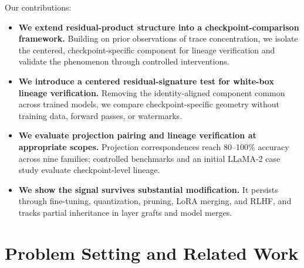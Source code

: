 \documentclass[letterpaper]{article}
\begin{document}
Our contributions:
\begin{itemize}[leftmargin=*,nosep]
\item \textbf{We extend residual-product structure into a checkpoint-comparison framework.} Building on prior observations of trace concentration, we isolate the centered, checkpoint-specific component for lineage verification and validate the phenomenon through controlled interventions.
\item \textbf{We introduce a centered residual-signature test for white-box lineage verification.} Removing the identity-aligned component common across trained models, we compare checkpoint-specific geometry without training data, forward passes, or watermarks.
\item \textbf{We evaluate projection pairing and lineage verification at appropriate scopes.} Projection correspondences reach 80--100\% accuracy across nine families; controlled benchmarks and an initial LLaMA-2 case study evaluate checkpoint-level lineage.
\item \textbf{We show the signal survives substantial modification.} It persists through fine-tuning, quantization, pruning, LoRA merging, and RLHF, and tracks partial inheritance in layer grafts and model merges.
\end{itemize}

\section{Problem Setting and Related Work}\label{sec:background}
\end{document}
